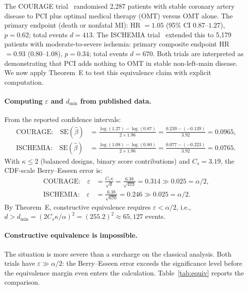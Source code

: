 \documentclass[11pt,a4paper]{article}
\theoremstyle{plain}
\theoremstyle{definition}
\begin{document}
The COURAGE trial~\cite{boden-courage} randomised 2{,}287 patients with stable coronary artery disease to PCI plus optimal medical therapy (OMT) versus OMT alone.  The primary endpoint (death or nonfatal MI): HR $= 1.05$ (95\% CI $0.87$--$1.27$), $p = 0.62$; total events $d = 413$.  The ISCHEMIA trial~\cite{maron-ischemia} extended this to 5{,}179 patients with moderate-to-severe ischemia: primary composite endpoint HR $= 0.93$ ($0.80$--$1.08$), $p = 0.34$; total events $d = 670$.  Both trials are interpreted as demonstrating that PCI adds nothing to OMT in stable non-left-main disease.  We now apply Theorem~E to test this equivalence claim with explicit computation.

\paragraph{Computing $\varepsilon$ and $d_{\min}$ from published data.}  From the reported confidence intervals:
\begin{align*}
  \text{COURAGE:}\quad \mathrm{SE}(\hat\beta) &= \frac{\log(1.27) - \log(0.87)}{2 \times 1.96} = \frac{0.239 - (-0.139)}{3.92} = 0.0965, \\[3pt]
  \text{ISCHEMIA:}\quad \mathrm{SE}(\hat\beta) &= \frac{\log(1.08) - \log(0.80)}{2 \times 1.96} = \frac{0.077 - (-0.223)}{3.92} = 0.0765.
\end{align*}
With $\kappa \leq 2$ (balanced designs, binary score contributions) and $C_s = 3.19$, the CDF-scale Berry--Esseen error is:
\begin{align*}
  \text{COURAGE:}\quad \varepsilon &= \frac{C_s \kappa}{\sqrt{d}} = \frac{6.38}{\sqrt{413}} = 0.314 \gg 0.025 = \alpha/2, \\[3pt]
  \text{ISCHEMIA:}\quad \varepsilon &= \frac{6.38}{\sqrt{670}} = 0.246 \gg 0.025 = \alpha/2.
\end{align*}
By Theorem~E, constructive equivalence requires $\varepsilon < \alpha/2$, i.e., $d > d_{\min} = (2C_s\kappa/\alpha)^2 = (255.2)^2 \approx 65{,}127$ events.

\paragraph{Constructive equivalence is impossible.}  The situation is more severe than a surcharge on the classical analysis.  Both trials have $\varepsilon \gg \alpha/2$: the Berry--Esseen error exceeds the significance level before the equivalence margin even enters the calculation.  Table~\ref{tab:equiv} reports the comparison.
\end{document}
